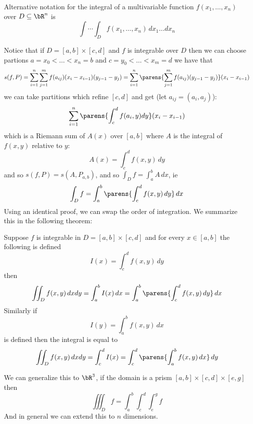 \documentclass[10pt]{article}
\begin{document}


\bigskip

\begin{defn*}

    Alternative notation for the integral of a multivariable function $f(x_1,\dots,x_n)$ over $D\subseteq\bR^n$ is
    \[ \int\cdots\int_D f(x_1,\dots,x_n)\,dx_1\dots dx_n \]

\end{defn*}

Notice that if $D=[a,b]\times[c,d]$ and $f$ is integrable over $D$ then we can choose partions $a=x_0<\dots<x_n=b$ and $c=y_0<\dots<x_m=d$ we have that
\[ s(f,P) = \sum_{i=1}^n\sum_{j=1}^m f(a_{ij})(x_i-x_{i-1})(y_{j-1}-y_j) = \sum_{i=1}^n\parens{\sum_{j=1}^m f(a_{ij})(y_{j-1}-y_j)}(x_i-x_{i-1}) \]
we can take partitions which refine $[c,d]$ and get (let $a_{ij}=(a_i,a_j)$):
\[ \sum_{i=1}^n\parens{\int_c^d f(a_i, y)dy}(x_i-x_{i-1}) \]
which is a Riemann sum of $A(x)$ over $[a,b]$ where $A$ is the integral of $f(x,y)$ relative to $y$:
\[ A(x) = \int_c^d f(x, y)\,dy \]
and so $s(f,P) = s(A,P_{a,b})$, and so $\int_D f = \int_a^b A\,dx$, ie
\[ \int_D f = \int_a^b\parens{\int_c^d f(x,y)\,dy}\,dx \]
Using an identical proof, we can swap the order of integration.
We summarize this in the following theorem:

\begin{thrm*}

    Suppose $f$ is integrable in $D=[a,b]\times[c,d]$ and for every $x\in[a,b]$ the following is defined
    \[ I(x) = \int_c^d f(x,y)\,dy \]
    then
    \[ \iint_D f(x,y)\,dxdy = \int_a^b I(x)\,dx = \int_a^b\parens{\int_c^d f(x,y)\,dy}\,dx \]
    Similarly if
    \[ I(y) = \int_a^b f(x,y)\,dx \]
    is defined then the integral is equal to
    \[ \iint_D f(x,y)\,dxdy = \int_c^d I(x) = \int_c^d\parens{\int_a^b f(x,y)\,dx}\,dy \]

\end{thrm*}

We can generalize this to $\bR^3$, if the domain is a prism $[a,b]\times[c,d]\times[e,g]$ then
\[ \iiint_D f = \int_a^b\int_c^d\int_e^g f \]
And in general we can extend this to $n$ dimensions.
\end{document}
